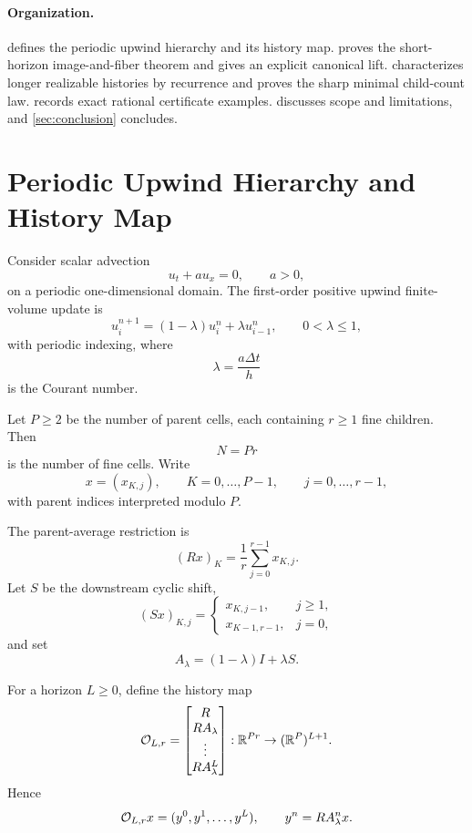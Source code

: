 \documentclass[11pt]{article}
\newcommand{\R}{\mathbb R}
\begin{document}
\paragraph{Organization.}
 defines the periodic upwind hierarchy and its history
map.   proves the short-horizon image-and-fiber
theorem and gives an explicit canonical lift.  
characterizes longer realizable histories by recurrence and proves the sharp
minimal child-count law.   records exact rational
certificate examples.   discusses scope and limitations,
and \cref{sec:conclusion} concludes.

\section{Periodic Upwind Hierarchy and History Map}
\label{sec:hierarchy}

Consider scalar advection
\[
  u_t+a u_x=0,
  \qquad a>0,
\]
on a periodic one-dimensional domain.  The first-order positive upwind
finite-volume update is
\[
  u_i^{n+1}
  =
  (1-\lambda)u_i^n+\lambda u_{i-1}^n,
  \qquad 0<\lambda\le1,
\]
with periodic indexing, where
\[
  \lambda=\frac{a\Delta t}{h}
\]
is the Courant number.

Let \(P\ge2\) be the number of parent cells, each containing \(r\ge1\) fine
children.  Then
\[
  N=Pr
\]
is the number of fine cells.  Write
\[
  x=(x_{K,j}),
  \qquad
  K=0,\ldots,P-1,
  \qquad
  j=0,\ldots,r-1,
\]
with parent indices interpreted modulo \(P\).

The parent-average restriction is
\[
  (Rx)_K=\frac1r\sum_{j=0}^{r-1}x_{K,j}.
\]
Let \(S\) be the downstream cyclic shift,
\[
  (Sx)_{K,j}
  =
  \begin{cases}
  x_{K,j-1}, & j\ge1,\\
  x_{K-1,r-1}, & j=0,
  \end{cases}
\]
and set
\[
  A_\lambda=(1-\lambda)I+\lambda S.
\]

For a horizon \(L\ge0\), define the history map
\[
  {\cal O}_{L,r}
  =
  \begin{bmatrix}
  R\\
  RA_\lambda\\
  \vdots\\
  RA_\lambda^L
  \end{bmatrix}
  :
  \R^{Pr}\to(\R^P)^{L+1}.
\]
Hence
\[
  {\cal O}_{L,r}x
  =
  (y^0,y^1,\ldots,y^L),
  \qquad
  y^n=RA_\lambda^n x.
\]
\end{document}
